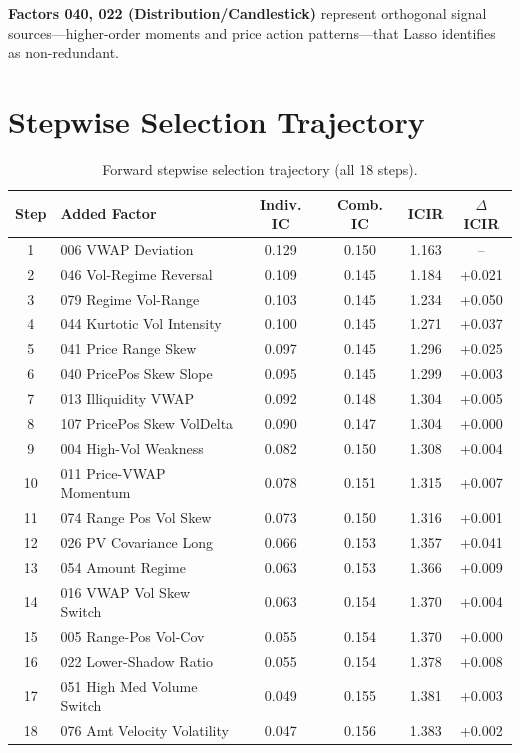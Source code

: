 \documentclass[sigconf]{acmart}
\begin{document}
\textbf{Factors 040, 022 (Distribution/Candlestick)} represent orthogonal signal sources---higher-order moments and price action patterns---that Lasso identifies as non-redundant.

\section{Stepwise Selection Trajectory}
\label{app:stepwise-trajectory}

\begin{table}[h]
  \caption{Forward stepwise selection trajectory (all 18 steps).}
  \label{tab:stepwise-full}
  \centering
  \begin{small}
  \begin{tabular}{clcccc}
    \toprule
    Step & Added Factor & Indiv. IC & Comb. IC & ICIR & $\Delta$ICIR \\
    \midrule
    1 & 006 VWAP Deviation & 0.129 & 0.150 & 1.163 & -- \\
    2 & 046 Vol-Regime Reversal & 0.109 & 0.145 & 1.184 & +0.021 \\
    3 & 079 Regime Vol-Range & 0.103 & 0.145 & 1.234 & +0.050 \\
    4 & 044 Kurtotic Vol Intensity & 0.100 & 0.145 & 1.271 & +0.037 \\
    5 & 041 Price Range Skew & 0.097 & 0.145 & 1.296 & +0.025 \\
    6 & 040 PricePos Skew Slope & 0.095 & 0.145 & 1.299 & +0.003 \\
    7 & 013 Illiquidity VWAP & 0.092 & 0.148 & 1.304 & +0.005 \\
    8 & 107 PricePos Skew VolDelta & 0.090 & 0.147 & 1.304 & +0.000 \\
    9 & 004 High-Vol Weakness & 0.082 & 0.150 & 1.308 & +0.004 \\
    10 & 011 Price-VWAP Momentum & 0.078 & 0.151 & 1.315 & +0.007 \\
    11 & 074 Range Pos Vol Skew & 0.073 & 0.150 & 1.316 & +0.001 \\
    12 & 026 PV Covariance Long & 0.066 & 0.153 & 1.357 & +0.041 \\
    13 & 054 Amount Regime & 0.063 & 0.153 & 1.366 & +0.009 \\
    14 & 016 VWAP Vol Skew Switch & 0.063 & 0.154 & 1.370 & +0.004 \\
    15 & 005 Range-Pos Vol-Cov & 0.055 & 0.154 & 1.370 & +0.000 \\
    16 & 022 Lower-Shadow Ratio & 0.055 & 0.154 & 1.378 & +0.008 \\
    17 & 051 High Med Volume Switch & 0.049 & 0.155 & 1.381 & +0.003 \\
    18 & 076 Amt Velocity Volatility & 0.047 & 0.156 & 1.383 & +0.002 \\
    \bottomrule
  \end{tabular}
  \end{small}
\end{table}
\end{document}
